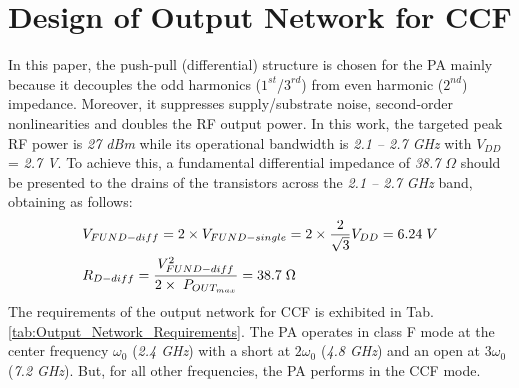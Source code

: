 \documentclass[conference]{IEEEtran}
\begin{document}
 

\section{Design of Output Network for CCF}
\label{section:ON}
In this paper, the push-pull (differential) structure is chosen for the PA mainly because it decouples the odd harmonics ($1^{st}$/$3^{rd}$) from even harmonic ($2^{nd}$) impedance. Moreover, it suppresses supply/substrate noise, second-order nonlinearities and doubles the RF output power. 
In this work, the targeted peak RF power is \textit{27 dBm}  while its operational bandwidth is \textit{2.1 -- 2.7 GHz} with $V_{DD}$ = \textit{2.7 V}. To achieve this, a  fundamental differential impedance of \textit{38.7} $\Omega$ should be presented to the drains of the transistors across the \textit{2.1 -- 2.7 GHz} band, obtaining as follows:
\vspace{-0.05in}
\begin{equation}
\begin{aligned}
&V_{FUND-diff}=2\times V_{FUND-single}=2\times\frac{2}{\sqrt{3}} V_{DD}=6.24 \hspace{1mm}V\\
&R_{D-diff}=\frac{V_{FUND-diff}^{2}}{2\times\hspace{1mm} P_{OUT_{max}}}=38.7 \hspace{1mm} \Omega
\label{eqn_diff_imp}
\end{aligned}
\end{equation}
The requirements of the output network for CCF is exhibited in Tab. \ref{tab:Output_Network_Requirements}. The PA operates in class F mode at the center frequency $\omega_0$ (\textit{2.4 GHz}) with a short at $2\omega_0$ (\textit{4.8 GHz}) and an open at $3\omega_0$ (\textit{7.2 GHz}). But, for all other frequencies, the PA performs in the CCF mode. 
\end{document}

